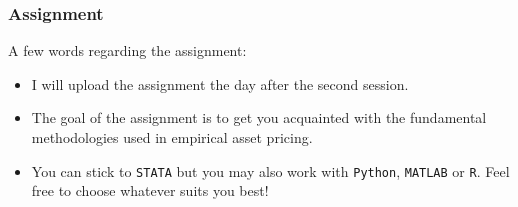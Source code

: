 \documentclass[xcolor=dvipsnames, english, 8pt]{beamer}
\begin{document}
\begin{frame}
\frametitle{Assignment}
A few words regarding the assignment:\vspace{0.25cm}\\
\begin{itemize}
    \item I will upload the assignment the day after the second session.
    \item The goal of the assignment is to get you acquainted with the fundamental methodologies used in empirical asset pricing.
    \item You can stick to \texttt{STATA} but you may also work with \texttt{Python}, \texttt{MATLAB} or \texttt{R}. Feel free to choose whatever suits you best!
\end{itemize}
\end{frame}
\end{document}
